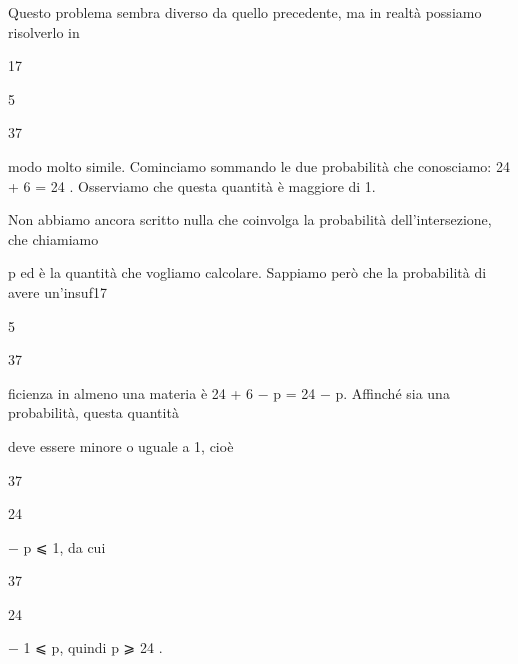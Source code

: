 \documentclass[a4paper,portrait,12pt]{article}
\begin{document}
\begin{flushleft}
Questo problema sembra diverso da quello precedente, ma in realt\`{a} possiamo risolverlo in
\end{flushleft}


17


5


37


\begin{flushleft}
modo molto simile. Cominciamo sommando le due probabilit\`{a} che conosciamo: 24 + 6 = 24 . Osserviamo che questa quantit\`{a} \`{e} maggiore di 1.
\end{flushleft}


\begin{flushleft}
Non abbiamo ancora scritto nulla che coinvolga la probabilit\`{a} dell'intersezione, che chiamiamo
\end{flushleft}


\begin{flushleft}
p ed \`{e} la quantit\`{a} che vogliamo calcolare. Sappiamo per\`{o} che la probabilit\`{a} di avere un'insuf17
\end{flushleft}


5


37


\begin{flushleft}
ficienza in almeno una materia \`{e} 24 + 6 $-$ p = 24 $-$ p. Affinch\'{e} sia una probabilit\`{a}, questa quantit\`{a}
\end{flushleft}


\begin{flushleft}
deve essere minore o uguale a 1, cio\`{e}
\end{flushleft}





37


24





\begin{flushleft}
$-$ p ⩽ 1, da cui
\end{flushleft}





37


24





\begin{flushleft}
$-$ 1 ⩽ p, quindi p ⩾ 24 .
\end{flushleft}
\end{document}

